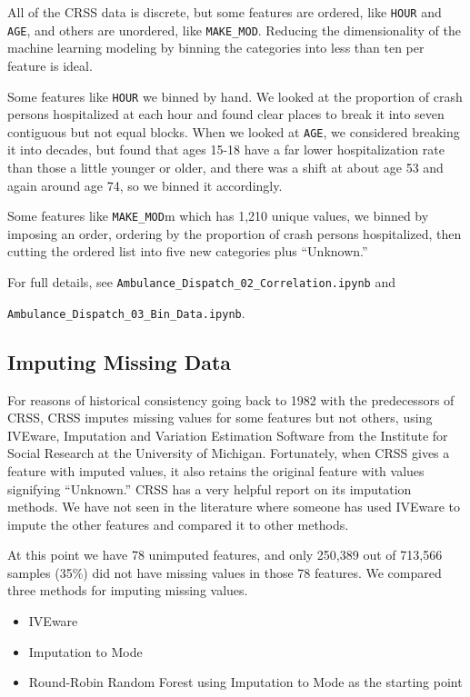 All of the CRSS data is discrete, but some features are ordered, like \verb|HOUR| and \verb|AGE|, and others are unordered, like \verb|MAKE_MOD|.  Reducing the dimensionality of the machine learning modeling by binning the categories into less than ten per feature is ideal.  

Some features like \verb|HOUR| we binned by hand.  We looked at the proportion of crash persons hospitalized at each hour and found clear places to break it into seven contiguous but not equal blocks.  When we looked at \verb|AGE|, we considered breaking it into decades, but found that ages 15-18 have a far lower hospitalization rate than those a little younger or older, and there was a shift at about age 53 and again around age 74, so we binned it accordingly.  

Some features like \verb|MAKE_MOD|m which has 1,210 unique values, we binned by imposing an order, ordering by the proportion of crash persons hospitalized, then cutting the ordered list into five new categories plus ``Unknown.''  

For full details, see 
\verb|Ambulance_Dispatch_02_Correlation.ipynb| and 

\verb|Ambulance_Dispatch_03_Bin_Data.ipynb|.

\subsection{Imputing Missing Data}

For reasons of historical consistency going back to 1982 with the predecessors of CRSS, CRSS imputes missing values for some features but not others, using IVEware, Imputation and Variation Estimation Software from the Institute for Social Research at the University of Michigan.  Fortunately, when CRSS gives a feature with imputed values, it also retains the original feature with values signifying ``Unknown.'' CRSS has a very helpful report on its imputation methods.  We have not seen in the literature where someone has used IVEware to impute the other features and compared it to other methods.  

At this point we have 78 unimputed features, and only 250,389 out of 713,566 samples (35\%) did not have missing values in those 78 features.  We compared three methods for imputing missing values.  

\begin{itemize}
	\item IVEware
	\item Imputation to Mode
	\item Round-Robin Random Forest using Imputation to Mode as the starting point
\end{itemize}

